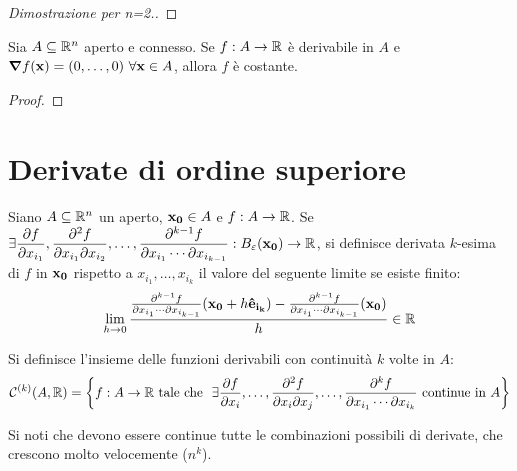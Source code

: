 \begin{proof}[Dimostrazione per n=2.]
\end{proof}

\begin{theorem}
    Sia $A \subseteq \mathbb{R}^n$ aperto e connesso. Se $f: A \to \mathbb{R}$ è derivabile in $A$ e $\grad f (\vb{x})=(0,\dots,0) \ \forall \vb{x} \in A$, allora $f$ è costante.
\end{theorem}

\begin{proof}
\end{proof}

\section{Derivate di ordine superiore}

\begin{definition}
    Siano $A \subseteq \mathbb{R}^n$ un aperto, $\vb{x_0} \in A$ e $f:A \to \mathbb{R}$. Se $\displaystyle \exists \frac{\partial f}{\partial x_{i_1}}, \frac{\partial^2 f}{\partial x_{i_1} \partial x_{i_2}},\dots,\frac{\partial ^{k-1}f}{\partial x_{i_1} \cdots \partial x_{i_{k-1}}} : B_\varepsilon(\vb{x_0}) \to \mathbb{R}$, si definisce derivata $k$-esima di $f$ in $\vb{x_0}$ rispetto a $x_{i_1},\dots,x_{i_{k}}$ il valore del seguente limite se esiste finito:
    \begin{equation*}
        \lim_{h\to 0}\frac{\frac{\partial^{k-1}f}{\partial x_{i_1}\cdots \partial x_{i_{k-1}}}(\vb{x_0}+ h \vb{\hat{e}_{i_k}})- \frac{\partial^{k-1}f}{\partial x_{i_1}\cdots \partial x_{i_{k-1}}}(\vb{x_0})}{h} \in \mathbb{R}
    \end{equation*}
\end{definition}

\begin{definition}
    [Insieme $\C{k}(A, \R)$]
    Si definisce l'insieme delle funzioni derivabili con continuità $k$ volte in $A$:
    \begin{equation*}
        \displaystyle \mathcal{C}^{(k)}(A,\mathbb{R}) = \left\{ f: A \to \mathbb{R} \text{ tale che } \ \exists \frac{\partial f}{\partial x_i},\dots,\frac{\partial ^2 f}{\partial x_i \partial x_j}, \dots, \frac{\partial ^k f}{\partial x_{i_1}\cdots\partial x_{i_k}} \text{ continue in } A \right\}
    \end{equation*}
\end{definition}

\begin{remark}
    Si noti che devono essere continue tutte le combinazioni possibili di derivate, che crescono molto velocemente ($n^k$).
\end{remark}

